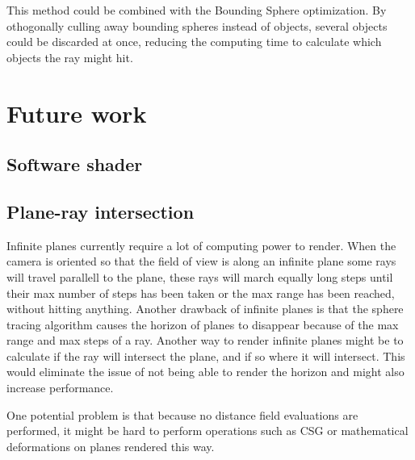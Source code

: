 			This method could be combined with the Bounding Sphere optimization.
			By othogonally culling away bounding spheres instead of objects, 
			several objects could be discarded at once, reducing the computing
			time to calculate which objects the ray might hit.

	\section{Future work}

		\subsection{Software shader}

			\subsection{Plane-ray intersection}

				Infinite planes currently require a lot of computing power to render. When
				the camera is oriented so that the field of view is along an infinite
				plane some rays will travel parallell to the plane, these rays will march 
				equally long steps until their max number of steps has been taken or
				the max range has been reached, without hitting anything. Another
				drawback of infinite planes is that the sphere tracing algorithm causes
				the horizon of planes to disappear because of the max range and max 
				steps of a ray. Another way to render infinite planes might be to 
				calculate if the ray will intersect the plane, and if so where it 
				will intersect. This would eliminate the issue of not being able 
				to render the horizon and might also increase performance.

				One potential problem is that because no distance field evaluations 
				are performed, it might be hard to perform operations such as CSG or
				mathematical deformations on planes rendered this way.


		
			

